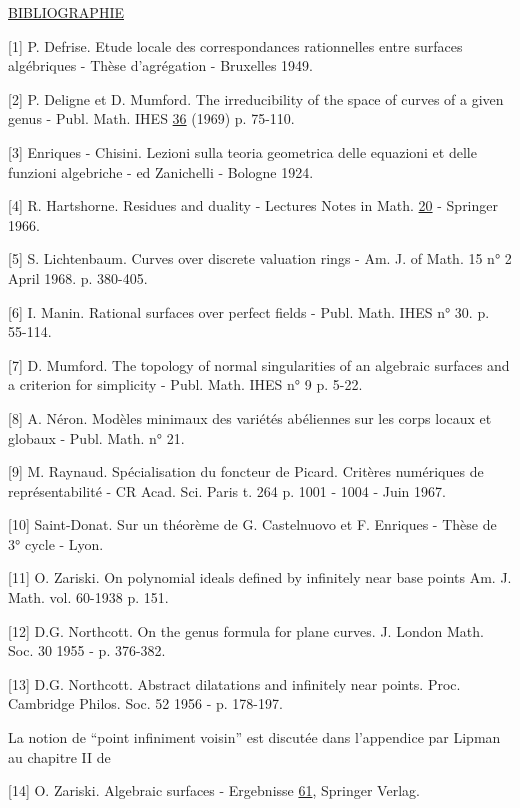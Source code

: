 \underline{BIBLIOGRAPHIE}

[1] \quad P. Defrise. Etude locale des correspondances rationnelles entre surfaces algébriques - Thèse d'agrégation - Bruxelles 1949.

[2] \quad P. Deligne et D. Mumford. The irreducibility of the space of curves of a given genus - Publ. Math. IHES \underline{36} (1969) p. 75-110.

[3] \quad Enriques - Chisini. Lezioni sulla teoria geometrica delle equazioni et delle funzioni algebriche - ed Zanichelli - Bologne 1924.

[4] \quad R. Hartshorne. Residues and duality - Lectures Notes in Math. \underline{20} - Springer 1966.

[5] \quad S. Lichtenbaum. Curves over discrete valuation rings - Am. J. of Math. 15 n° 2 April 1968. p. 380-405.

[6] \quad I. Manin. Rational surfaces over perfect fields - Publ. Math. IHES n° 30. p. 55-114.

[7] \quad D. Mumford. The topology of normal singularities of an algebraic surfaces and a criterion for simplicity - Publ. Math. IHES n° 9 p. 5-22.

[8] \quad A. Néron. Modèles minimaux des variétés abéliennes sur les corps locaux et globaux - Publ. Math. n° 21.



[9] \quad M. Raynaud. Spécialisation du foncteur de Picard. Critères numériques de représentabilité - CR Acad. Sci. Paris t. 264 p. 1001 - 1004 - Juin 1967.

[10] \quad Saint-Donat. Sur un théorème de G. Castelnuovo et F. Enriques - Thèse de 3° cycle - Lyon.

[11] \quad O. Zariski. On polynomial ideals defined by infinitely near base points Am. J. Math. vol. 60-1938 p. 151.

[12] \quad D.G. Northcott. On the genus formula for plane curves. J. London Math. Soc. 30 1955 - p. 376-382.

[13] \quad D.G. Northcott. Abstract dilatations and infinitely near points. Proc. Cambridge Philos. Soc. 52 1956 - p. 178-197.

La notion de ``point infiniment voisin'' est discutée dans l'appendice par Lipman au chapitre II de

[14] \quad O. Zariski. Algebraic surfaces - Ergebnisse \underline{61}, Springer Verlag.
